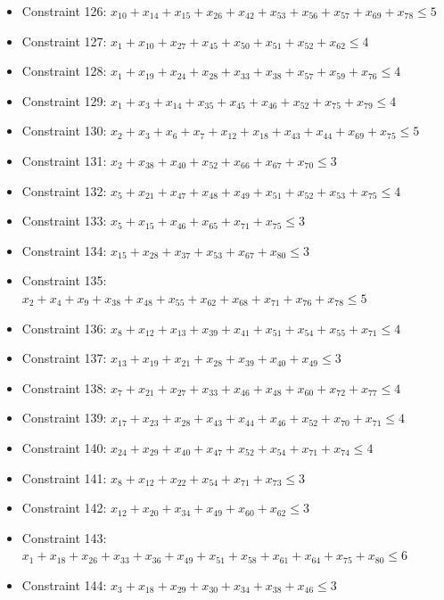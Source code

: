 \documentclass[11pt]{article}
\begin{document}
\begin{itemize}
\item Constraint 126: $x_{10} + x_{14} + x_{15} + x_{26} + x_{42} + x_{53} + x_{56} + x_{57} + x_{69} + x_{78} \le 5$
\item Constraint 127: $x_{1} + x_{10} + x_{27} + x_{45} + x_{50} + x_{51} + x_{52} + x_{62} \le 4$
\item Constraint 128: $x_{1} + x_{19} + x_{24} + x_{28} + x_{33} + x_{38} + x_{57} + x_{59} + x_{76} \le 4$
\item Constraint 129: $x_{1} + x_{3} + x_{14} + x_{35} + x_{45} + x_{46} + x_{52} + x_{75} + x_{79} \le 4$
\item Constraint 130: $x_{2} + x_{3} + x_{6} + x_{7} + x_{12} + x_{18} + x_{43} + x_{44} + x_{69} + x_{75} \le 5$
\item Constraint 131: $x_{2} + x_{38} + x_{40} + x_{52} + x_{66} + x_{67} + x_{70} \le 3$
\item Constraint 132: $x_{5} + x_{21} + x_{47} + x_{48} + x_{49} + x_{51} + x_{52} + x_{53} + x_{75} \le 4$
\item Constraint 133: $x_{5} + x_{15} + x_{46} + x_{65} + x_{71} + x_{75} \le 3$
\item Constraint 134: $x_{15} + x_{28} + x_{37} + x_{53} + x_{67} + x_{80} \le 3$
\item Constraint 135: $x_{2} + x_{4} + x_{9} + x_{38} + x_{48} + x_{55} + x_{62} + x_{68} + x_{71} + x_{76} + x_{78} \le 5$
\item Constraint 136: $x_{8} + x_{12} + x_{13} + x_{39} + x_{41} + x_{51} + x_{54} + x_{55} + x_{71} \le 4$
\item Constraint 137: $x_{13} + x_{19} + x_{21} + x_{28} + x_{39} + x_{40} + x_{49} \le 3$
\item Constraint 138: $x_{7} + x_{21} + x_{27} + x_{33} + x_{46} + x_{48} + x_{60} + x_{72} + x_{77} \le 4$
\item Constraint 139: $x_{17} + x_{23} + x_{28} + x_{43} + x_{44} + x_{46} + x_{52} + x_{70} + x_{71} \le 4$
\item Constraint 140: $x_{24} + x_{29} + x_{40} + x_{47} + x_{52} + x_{54} + x_{71} + x_{74} \le 4$
\item Constraint 141: $x_{8} + x_{12} + x_{22} + x_{54} + x_{71} + x_{73} \le 3$
\item Constraint 142: $x_{12} + x_{20} + x_{34} + x_{49} + x_{60} + x_{62} \le 3$
\item Constraint 143: $x_{1} + x_{18} + x_{26} + x_{33} + x_{36} + x_{49} + x_{51} + x_{58} + x_{61} + x_{64} + x_{75} + x_{80} \le 6$
\item Constraint 144: $x_{3} + x_{18} + x_{29} + x_{30} + x_{34} + x_{38} + x_{46} \le 3$

\end{itemize}
\end{document}

